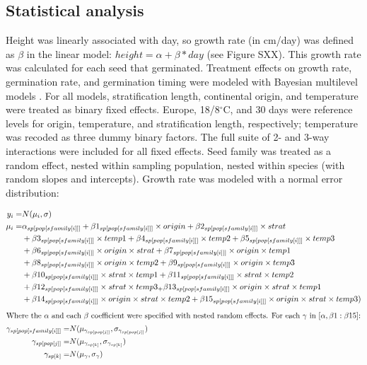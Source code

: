 \documentclass[12pt]{article}\usepackage[]{graphicx}\usepackage[]{color}
\begin{document}
	\subsection{Statistical analysis}
	Height was linearly associated with day, so growth rate (in cm/day) was defined as $\beta$ in the linear model: $height = \alpha + \beta*day $ (see Figure SXX). This growth rate was calculated for each seed that germinated. Treatment effects on growth rate, germination rate, and germination timing were modeled with Bayesian multilevel models \parencite{Gelman2004}. For all models, stratification length, continental origin, and temperature were treated as binary fixed effects. Europe, 18/8$^\circ$C, and 30 days were reference levels for origin, temperature, and stratification length, respectively; temperature was recoded as three dummy binary factors. The full suite of 2- and 3-way interactions were included for all fixed effects. Seed family was treated as a random effect, nested within sampling population, nested within species (with random slopes and intercepts). Growth rate was modeled with a normal error distribution: 

\begin{align}
y_i =&  N(\mu_i,\sigma)\\
  \mu_i =&  \alpha_{sp[pop[sfamily[i]]]} + \beta 1_{sp[pop[sfamily[i]]]}\times origin +  \beta 2_{sp[pop[sfamily[i]]]} \times strat\\
          & +\beta 3_{sp[pop[sfamily[i]]]}\times temp1 +  \beta 4_{sp[pop[sfamily[i]]]}\times temp2 + \beta 5_{sp[pop[sfamily[i]]]}\times temp3 \notag \\
          & 
 		 + \beta 6_{sp[pop[sfamily[i]]]}\times origin\times strat  + \beta 7_{sp[pop[sfamily[i]]]}\times origin \times temp1 \notag\\ &
 		 + \beta 8_{sp[pop[sfamily[i]]]}\times origin \times temp2 + \beta 9_{sp[pop[sfamily[i]]]}\times origin \times temp3 \notag \\ &
 		 +\beta 10_{sp[pop[sfamily[i]]]}\times strat\times temp1 +\beta 11_{sp[pop[sfamily[i]]]}\times strat \times temp2 \notag \\ &
 		 + \beta 12_{sp[pop[sfamily[i]]]}\times strat \times temp3_ + \beta 13_{sp[pop[sfamily[i]]]}\times origin \times strat \times temp1 \notag\\ &
 		 +\beta 14_{sp[pop[sfamily[i]]]}\times origin \times strat \times temp2 + \beta 15_{sp[pop[sfamily[i]]]}\times origin \times strat \times temp3 )\notag
 \end{align}
 \begin{align}
 		 \intertext{Where the $\alpha$ and each $\beta$ coefficient were specified with nested random effects. For each $\gamma$ in $[\alpha,\beta 1:\beta 15]$:}
 		 \gamma_{sp[pop[sfamily[i]]]} =& N(\mu_{\gamma_{sp[pop[j]]}}, \sigma_{\gamma_{sp[pop[j]]}}) \\
 		 \gamma_{sp[pop[j]]} = & N(\mu_{\gamma_{sp[k]}}, \sigma_{\gamma_{sp[k]}}) \\
 		 \gamma_{sp[k]} = & N(\mu_{\gamma}, \sigma_{\gamma})
\end{align}
\end{document}
